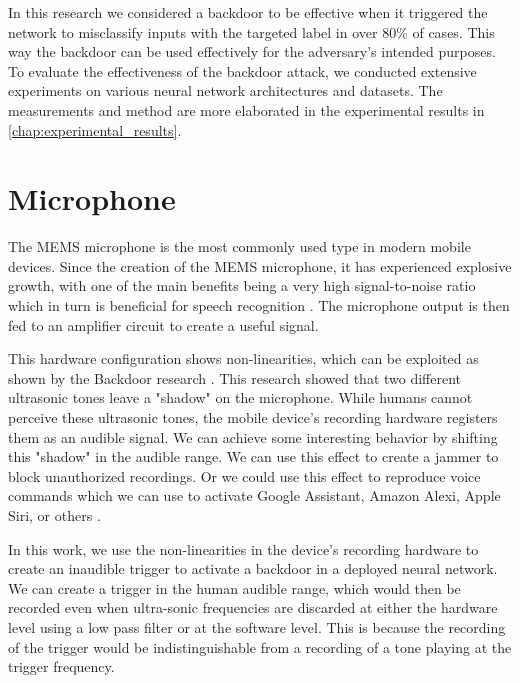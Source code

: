 \documentclass{report}
\theoremstyle{definition}
\theoremstyle{remark}
\begin{document}
In this research we considered a backdoor to be effective when it triggered the network to misclassify inputs with the targeted label in over 80\% of cases. This way the backdoor can be used effectively for the adversary's intended purposes. To evaluate the effectiveness of the backdoor attack, we conducted extensive experiments on various neural network architectures and datasets. The measurements and method are more elaborated in the experimental results in \autoref{chap:experimental_results}. 



\section{Microphone}
The MEMS microphone is the most commonly used type in modern mobile devices. Since the creation of the MEMS microphone, it has experienced explosive growth, with one of the main benefits being a very high signal-to-noise ratio which in turn is beneficial for speech recognition \cite{7180939}. The microphone output is then fed to an amplifier circuit to create a useful signal.

This hardware configuration shows non-linearities, which can be exploited as shown by the Backdoor research \cite{BACKDOORMEMS}. This research showed that two different ultrasonic tones leave a "shadow" on the microphone. While humans cannot perceive these ultrasonic tones, the mobile device's recording hardware registers them as an audible signal. We can achieve some interesting behavior by shifting this "shadow" in the audible range. We can use this effect to create a jammer \cite{JAMMER} to block unauthorized recordings. Or we could use this effect to reproduce voice commands which we can use to activate Google Assistant,  Amazon Alexi, Apple Siri, or others \cite{POSTER} \cite{DOLPHIN}.

In this work, we use the non-linearities in the device's recording hardware to create an inaudible trigger to activate a backdoor in a deployed neural network. We can create a trigger in the human audible range, which would then be recorded even when ultra-sonic frequencies are discarded at either the hardware level using a low pass filter or at the software level. This is because the recording of the trigger would be indistinguishable from a recording of a tone playing at the trigger frequency.
 
\end{document}
